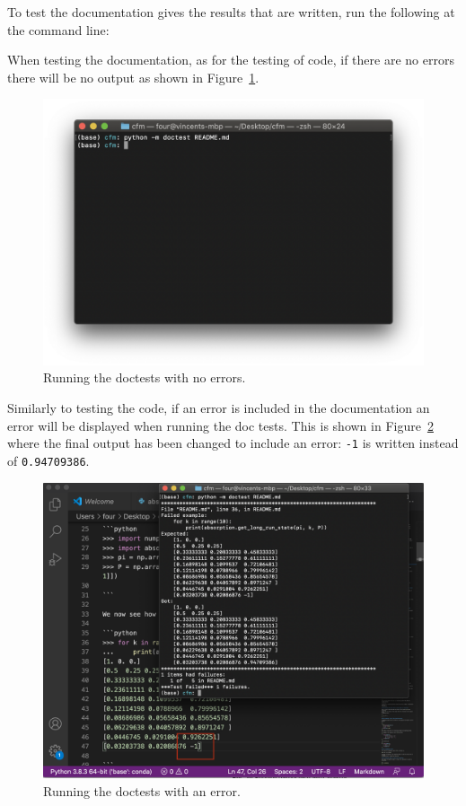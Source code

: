 To test the documentation gives the results that are written, run the following
at the command line:



When testing the documentation, as for the testing of code, if there are no
errors there will be no output as shown in
Figure~\ref{fig:running_doctests_with_no_errors}.

\begin{figure}[htbp]
\centering

\includegraphics[width=0.750\linewidth]{./assets/running_doctests_with_no_errors/main.png}
\caption{Running the doctests with no errors.}
\label{fig:running_doctests_with_no_errors}
\end{figure}


Similarly to testing the code, if an error is included in the documentation an
error will be displayed when running the doc tests. This is shown in
Figure~\ref{fig:running_doctests_with_an_error} where the final output has been
changed to include an error: \texttt{-1} is written instead of \texttt{0.94709386}.

\begin{figure}[htbp]
\centering

\includegraphics[width=0.750\linewidth]{./assets/running_doctests_with_an_error/main.png}
\caption{Running the doctests with an error.}
\label{fig:running_doctests_with_an_error}
\end{figure}

